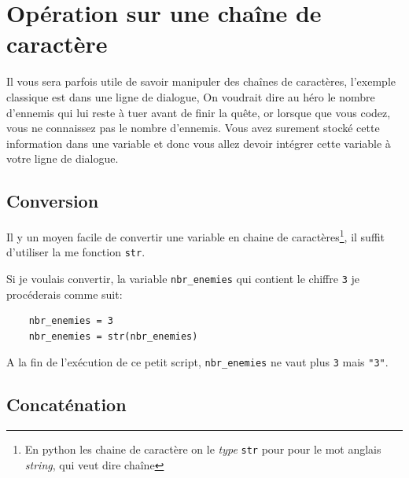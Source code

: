 \documentclass[12pt,a4paper]{report}
\newcommand{\codeintext}[1]{\texttt{#1}}
\begin{document}
\section{Opération sur une chaîne de caractère}

Il vous sera parfois utile de savoir manipuler des chaînes de caractères, l'exemple classique est dans une ligne de dialogue, On voudrait dire au héro le nombre d'ennemis qui lui reste à tuer avant de finir la quête, or lorsque que vous codez, vous ne connaissez pas le nombre d'ennemis. Vous avez surement stocké cette information dans une variable et donc vous allez devoir intégrer cette variable à votre ligne de dialogue.

\subsection{Conversion}
Il y un moyen facile de convertir une variable en chaine de caractères\footnote{En python les chaine de caractère on le \emph{type} \codeintext{str} pour pour le mot anglais \textit{string}, qui veut dire chaîne}, il suffit d'utiliser la me fonction \codeintext{str}.

Si je voulais convertir, la variable \codeintext{nbr\_enemies} qui contient le chiffre \codeintext{3} je procéderais comme suit:

\begin{lstlisting}
	nbr_enemies = 3
	nbr_enemies = str(nbr_enemies)
\end{lstlisting}

A la fin de l'exécution de ce petit script, \codeintext{nbr\_enemies} ne vaut plus \codeintext{3} mais \codeintext{"3"}.

\subsection{Concaténation}
\end{document}
